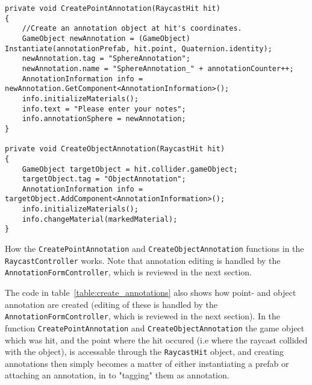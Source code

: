 \begin{table}
\label{table:create_annotations}
\lstset{style=csharp}
\begin{lstlisting}
private void CreatePointAnnotation(RaycastHit hit)
{
    //Create an annotation object at hit's coordinates. 
    GameObject newAnnotation = (GameObject) Instantiate(annotationPrefab, hit.point, Quaternion.identity);
    newAnnotation.tag = "SphereAnnotation";
    newAnnotation.name = "SphereAnnotation_" + annotationCounter++;
    AnnotationInformation info = newAnnotation.GetComponent<AnnotationInformation>();
    info.initializeMaterials();
    info.text = "Please enter your notes";
    info.annotationSphere = newAnnotation;
}

private void CreateObjectAnnotation(RaycastHit hit)
{
    GameObject targetObject = hit.collider.gameObject;
    targetObject.tag = "ObjectAnnotation";
    AnnotationInformation info = targetObject.AddComponent<AnnotationInformation>();
    info.initializeMaterials();
    info.changeMaterial(markedMaterial);
}
\end{lstlisting}
\caption[How the \texttt{CreatePointAnnotation} and \texttt{CreateObjectAnnotation} functions in the \texttt{RaycastController} works.]
{How the \texttt{CreatePointAnnotation} and \texttt{CreateObjectAnnotation} functions in the \texttt{RaycastController} works.
Note that annotation editing is handled by the \texttt{AnnotationFormController}, which is reviewed in the next section.}
\end{table}

The code in table~\vref{table:create_annotations} also shows how point- and object annotation are created (editing of these is handled by the \texttt{AnnotationFormController}, 
which is reviewed in the next section). In the function \texttt{CreatePointAnnotation} and \texttt{CreateObjectAnnotation} the game object which was hit, and the point where the
hit occured (i.e where the raycast collided with the object), is accessable through the \texttt{RaycastHit} object, and creating annotations then simply becomes a 
matter of either instantiating a prefab or attaching an annotation, in to "tagging" them as annotation. 



